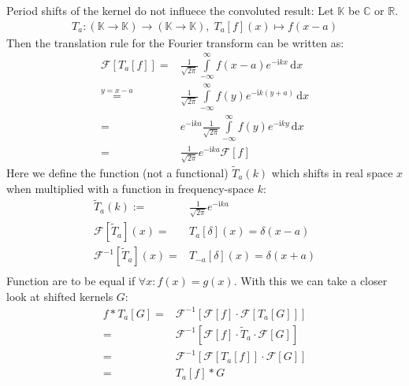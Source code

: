 \documentclass[10pt,a4paper]{article}
\begin{document}
Period shifts of the kernel do not influece the convoluted result:
Let $\mathbb{K}$ be $\mathbb{C}$ or $\mathbb{R}$.
\begin{align}
T_a : \left( \mathbb{K} \rightarrow \mathbb{K} \right) \rightarrow
      \left( \mathbb{K} \rightarrow \mathbb{K} \right) , \;
      T_a[f](x) \mapsto f(x-a)
\end{align}
Then the translation rule for the Fourier transform can be written as:
\begin{align}
\mathcal{F}\left[ T_a[f] \right]
 = & \frac{1}{ \sqrt{2\pi} }
    \int\limits_{-\infty}^{\infty}
        f(x-a) e^{-\mathrm{i} k x}
    \,\mathrm{d}x \\
 \overset{ y = x-a }{ = } &
    \frac{1}{ \sqrt{2\pi} }
    \int\limits_{-\infty}^{\infty}
        f(y) e^{-\mathrm{i} k (y+a)}
    \,\mathrm{d}x \\
 = & e^{-\mathrm{i} k a}
    \frac{1}{ \sqrt{2\pi} }
    \int\limits_{-\infty}^{\infty}
        f(y) e^{-\mathrm{i} k y}
    \,\mathrm{d}x \\
 = & \frac{1}{ \sqrt{2\pi} } e^{-\mathrm{i} k a} \mathcal{F}\left[ f \right]
\end{align}
Here we define the function (not a functional) $\tilde{T}_a(k)$ which shifts in real space $x$ when multiplied with a function in frequency-space $k$:
\begin{align}
    \tilde{T}_a(k) := & \frac{1}{ \sqrt{2\pi} } e^{-\mathrm{i} k a} \\
    \mathcal{F}\left[ \tilde{T}_a \right](x)
    = & T_a\left[ \delta \right](x)
    =   \delta\left( x-a \right) \\
    \mathcal{F}^{-1}\left[ \tilde{T}_a \right](x)
    = & T_{-a}\left[ \delta \right](x)
    =   \delta\left( x+a \right) \\
\end{align}
Function are to be equal if $\forall x: f(x) = g(x)$.
With this we can take a closer look at shifted kernels $G$:
\begin{align}
    f \ast T_a[G]
    = & \mathcal{F}^{-1}\left[
          \mathcal{F}\left[ f \right] \cdot
          \mathcal{F}\left[ T_a[G] \right]
      \right] \\
    = & \mathcal{F}^{-1}\left[
          \mathcal{F}\left[ f \right] \cdot
          \tilde{T}_a \cdot
          \mathcal{F}\left[ G \right]
      \right] \\
    = & \mathcal{F}^{-1}\left[
          \mathcal{F}\left[ T_a[f] \right] \cdot
          \mathcal{F}\left[ G \right]
      \right] \\
    = & T_a[f] \ast G
\end{align}
\end{document}
